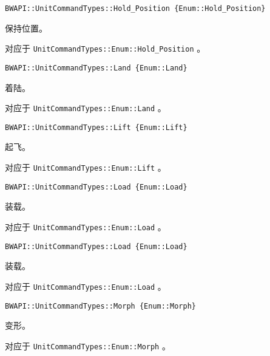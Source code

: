 \begin{tcolorbox}[colback=white, colframe=black!60!white, title=Hold\_Position\{\}, arc=0mm]
\begin{verbatim}
BWAPI::UnitCommandTypes::Hold_Position {Enum::Hold_Position}
\end{verbatim}
保持位置。\par 对应于   \verb|UnitCommandTypes::Enum::Hold_Position|  。
\end{tcolorbox}


\begin{tcolorbox}[colback=white, colframe=black!60!white, title=Land\{\}, arc=0mm]
\begin{verbatim}
BWAPI::UnitCommandTypes::Land {Enum::Land}
\end{verbatim}
着陆。\par 对应于   \verb|UnitCommandTypes::Enum::Land|  。
\end{tcolorbox}


\begin{tcolorbox}[colback=white, colframe=black!60!white, title=Lift\{\}, arc=0mm]
\begin{verbatim}
BWAPI::UnitCommandTypes::Lift {Enum::Lift}
\end{verbatim}
起飞。\par 对应于   \verb|UnitCommandTypes::Enum::Lift|  。
\end{tcolorbox}


\begin{tcolorbox}[colback=white, colframe=black!60!white, title=Load\{\}, arc=0mm]
\begin{verbatim}
BWAPI::UnitCommandTypes::Load {Enum::Load}
\end{verbatim}
装载。\par 对应于   \verb|UnitCommandTypes::Enum::Load|  。
\end{tcolorbox}


\begin{tcolorbox}[colback=white, colframe=black!60!white, title=Lift\{\}, arc=0mm]
\begin{verbatim}
BWAPI::UnitCommandTypes::Load {Enum::Load}
\end{verbatim}
装载。\par 对应于   \verb|UnitCommandTypes::Enum::Load|  。
\end{tcolorbox}


\begin{tcolorbox}[colback=white, colframe=black!60!white, title=Morph\{\}, arc=0mm]
\begin{verbatim}
BWAPI::UnitCommandTypes::Morph {Enum::Morph}
\end{verbatim}
变形。\par 对应于   \verb|UnitCommandTypes::Enum::Morph|  。
\end{tcolorbox}



